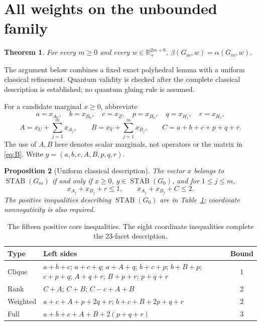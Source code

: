 \documentclass[11pt,a4paper]{article}
\newtheorem{theorem}{Theorem}[section]
\newtheorem{proposition}[theorem]{Proposition}
\theoremstyle{remark}\newtheorem{remark}[theorem]{Remark}
\newcommand{\STAB}{\operatorname{STAB}}
\newcommand{\R}{\mathbb R}
\begin{document}
\section{All weights on the unbounded family}\label{sec:allweights}
\begin{theorem}\label{thm:allweights}
For every $m\geq0$ and every $w\in\R_+^{2m+8}$,
$\beta(G_m,w)=\alpha(G_m,w)$.
\end{theorem}
The argument below combines a fixed exact polyhedral lemma with a uniform
classical refinement. Quantum validity is checked after the complete
classical description is established; no quantum gluing rule is assumed.

For a candidate marginal $x\geq0$, abbreviate
\[
 a=x_{A_0},\quad b=x_{B_0},\quad c=x_Z,\quad
 p=x_{H_0},\quad q=x_{H_1},\quad r=x_{H_c},
\]
\[
 A=x_U+\sum_{j=1}^m x_{A_j},\qquad
 B=x_V+\sum_{j=1}^m x_{B_j},\qquad C=a+b+c+p+q+r.
\]
The use of $A,B$ here denotes scalar marginals, not operators or the
matrix in \eqref{eq:B}. Write $y=(a,b,c,A,B,p,q,r)$.
\begin{proposition}[Uniform classical description]\label{prop:description}
The vector $x$ belongs to $\STAB(G_m)$ if and only if $x\geq0$,
$y\in\STAB(G_0)$, and for $1\leq j\leq m$,
\begin{equation}\label{eq:pairs}
 x_{A_j}+x_{B_j}+r\leq1,\qquad
 x_{A_j}+x_{B_j}+C\leq2.
\end{equation}
The positive inequalities describing $\STAB(G_0)$ are in
Table~\ref{tab:core}; coordinate nonnegativity is also required.
\end{proposition}
\begin{table}[ht]
\centering\small
\begin{tabular}{p{.18\linewidth}p{.63\linewidth}c}
\toprule Type & Left sides & Bound\\\midrule
Clique & $a+b+c$; $a+c+q$; $a+A+q$; $b+c+p$; $b+B+p$;
 $c+p+q$; $A+q+r$; $B+p+r$; $p+q+r$ & 1\\
Rank & $C+A$; $C+B$; $C-c+A+B$ & 2\\
Weighted & $a+c+A+p+2q+r$; $b+c+B+2p+q+r$ & 2\\
Full & $a+b+c+A+B+2(p+q+r)$ & 3\\\bottomrule
\end{tabular}
\caption{The fifteen positive core inequalities. The eight coordinate
inequalities complete the 23-facet description.}\label{tab:core}
\end{table}
\end{document}
